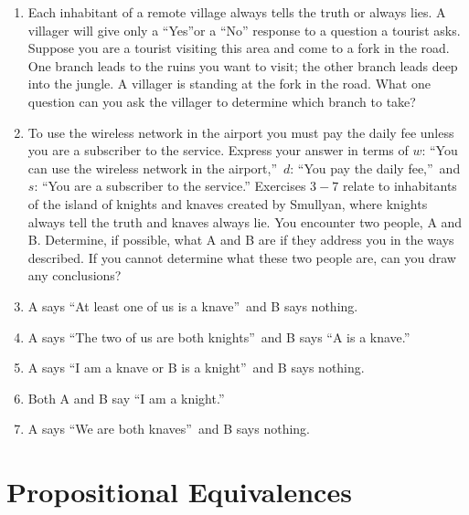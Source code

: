 \documentclass{../../cls/sig-alternate-05-2015}
\begin{document}
\begin{enumerate}
\item Each inhabitant of a remote village always tells the truth
or always lies. A villager will give only a \textquotedblleft Yes\textquotedblright or a \textquotedblleft No\textquotedblright
response to a question a tourist asks. Suppose you are a
tourist visiting this area and come to a fork in the road.
One branch leads to the ruins you want to visit; the other
branch leads deep into the jungle. A villager is standing
at the fork in the road. What one question can you ask the
villager to determine which branch to take?

\item To use the wireless network in the airport you must pay
the daily fee unless you are a subscriber to the service.
Express your answer in terms of $w$: \textquotedblleft You can use the wireless
network in the airport,\textquotedblright\ $d$: \textquotedblleft You pay the daily fee,\textquotedblright\ 
and $s$: \textquotedblleft You are a subscriber to the service.\textquotedblright
\newline\newline
Exercises $3 - 7$ relate to inhabitants of the island of knights
and knaves created by Smullyan, where knights always tell
the truth and knaves always lie. You encounter two people,
A and B. Determine, if possible, what A and B are if they
address you in the ways described. If you cannot determine
what these two people are, can you draw any conclusions?

\item A says \textquotedblleft At least one of us is a knave\textquotedblright\ and B says nothing.
\item A says \textquotedblleft The two of us are both knights\textquotedblright\ and B says \textquotedblleft A
is a knave.\textquotedblright
\item A says \textquotedblleft I am a knave or B is a knight\textquotedblright\ and B says nothing.
\item Both A and B say \textquotedblleft I am a knight.\textquotedblright 
\item A says \textquotedblleft We are both knaves\textquotedblright\ and B says nothing.

\end{enumerate}

\section{Propositional Equivalences}
\end{document}
